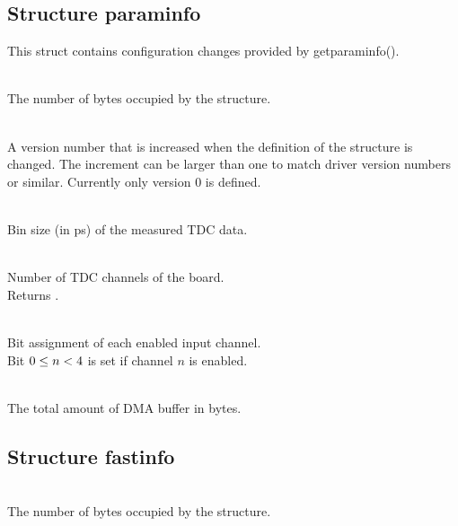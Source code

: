 
\subsection{Structure \prefix param\tu info}
This struct contains configuration changes provided by \textsf{\prefix get\tu param\tu info()}.

\\
The number of bytes occupied by the structure. \par

\\
A version number that is increased when the definition of the structure is changed. The increment can be larger than one to match driver version numbers or similar. Currently only version 0 is defined.\par


\\
Bin size (in ps) of the measured TDC data.


\\
Number of TDC channels of the board.\\
Returns .\par

\\
Bit assignment of each enabled input channel.\\
Bit $0 \leq n < \ifxHPTDC{8}{4}$ is set if channel $n$ is enabled. \par

\\
The total amount of DMA buffer in bytes.


\subsection{Structure \prefix fast\tu info}

\\
The number of bytes occupied by the structure. \par

